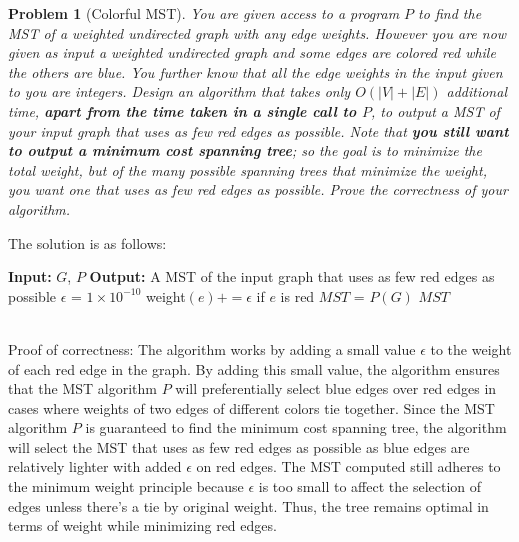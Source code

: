 \documentclass[10pt]{article}
\newtheorem{problem}{\sc\color{cit}Problem}
\begin{document}
\begin{problem}[Colorful MST]
    You are given access to a program $P$ to find the MST of a weighted undirected graph with any edge weights. However you are now given as input a weighted undirected graph and some edges are colored red while the others are blue. You further know that all the edge weights in the input given to you are integers. Design an algorithm that takes only $O(|V|+|E|)$ additional time, \textbf{apart from the time taken in a single call to $P$}, to output a MST of your input graph that uses as few red edges as possible. Note that \textbf{you still want to output a minimum cost spanning tree}; so the goal is to minimize the total weight, but of the many possible spanning trees that minimize the weight, you want one that uses as few red edges as possible. Prove the correctness of your algorithm.
\end{problem}
\begin{solution}
    The solution is as follows:
    \begin{algorithm}
        \caption{Colorful MST} 
        \begin{algorithmic}[1]
        \Statex \textbf{Input:} $G$, $P$
        \Statex \textbf{Output:} A MST of the input graph that uses as few red edges as possible
        \Statex 
            \State $\epsilon$ = $1 \times 10^{-10}$
                \State weight$(e) += \epsilon$ if $e$ is red
            \EndFor
            \State $MST$ = $P(G)$ 
            \Return $MST$
        \EndFunction
        \end{algorithmic}
    \end{algorithm} \\
    Proof of correctness: The algorithm works by adding a small value $\epsilon$ to the weight of each red edge in the graph. By adding this small value, the algorithm ensures that the MST algorithm $P$ will preferentially select blue edges over red edges in cases where weights of two edges of different colors tie together.
     Since the MST algorithm $P$ is guaranteed to find the minimum cost spanning tree, the algorithm will select the MST that uses as few red edges as possible as blue edges are relatively lighter with added $\epsilon$ on red edges.
     The MST computed still adheres to the minimum weight principle because $\epsilon$ is too small to affect the selection of edges unless there's a tie by original weight. Thus, the tree remains optimal in terms of weight while minimizing red edges.
\end{solution}
\end{document}

